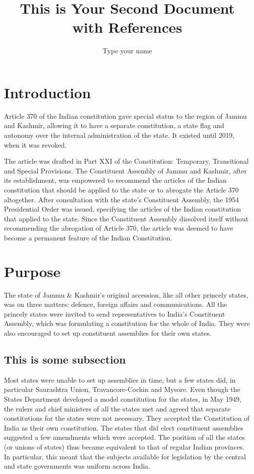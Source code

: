\documentclass{article}
\title{This is Your Second Document with References}
\author{Type your name}
\begin{document}
\maketitle

\tableofcontents %


\section{Introduction}
Article 370 of the Indian constitution gave special status to the region of Jammu and Kashmir, allowing it to have a separate constitution, a state flag and autonomy over the internal administration of the state. It existed until 2019, when it was revoked.

The article was drafted in Part XXI of the Constitution: Temporary, Transitional and Special Provisions. The Constituent Assembly of Jammu and Kashmir, after its establishment, was empowered to recommend the articles of the Indian constitution that should be applied to the state or to abrogate the Article 370 altogether. After consultation with the state's Constituent Assembly, the 1954 Presidential Order was issued, specifying the articles of the Indian constitution that applied to the state. Since the Constituent Assembly dissolved itself without recommending the abrogation of Article 370, the article was deemed to have become a permanent feature of the Indian Constitution.\cite{small}

\section{Purpose}
The state of Jammu \& Kashmir's original accession, like all other princely states, was on three matters: defence, foreign affairs and communications. All the princely states were invited to send representatives to India's Constituent Assembly, which was formulating a constitution for the whole of India. They were also encouraged to set up constituent assemblies for their own states.

\subsection{This is some subsection}
Most states were unable to set up assemblies in time, but a few states did, in particular Saurashtra Union, Travancore-Cochin and Mysore. Even though the States Department developed a model constitution for the states, in May 1949, the rulers and chief ministers of all the states met and agreed that separate constitutions for the states were not necessary. They accepted the Constitution of India as their own constitution. The states that did elect constituent assemblies suggested a few amendments which were accepted. The position of all the states (or unions of states) thus became equivalent to that of regular Indian provinces. In particular, this meant that the subjects available for legislation by the central and state governments was uniform across India. \cite{big}
\end{document}
